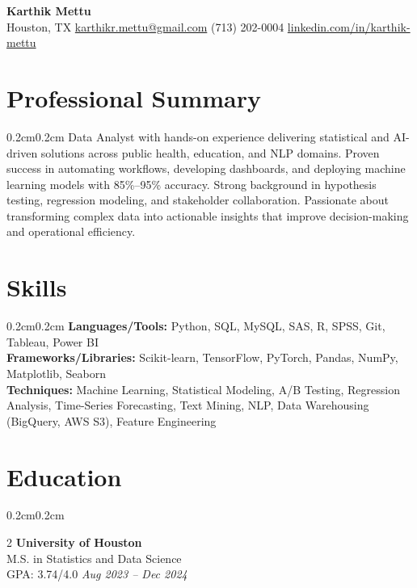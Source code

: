 \documentclass[10pt, letterpaper]{article}
\newenvironment{onecolentry}{\begin{adjustwidth}{0.2cm}{0.2cm}}{\end{adjustwidth}}
\newenvironment{twocolentry}[2][]{\onecolentry\def\secondColumn{#2}\setcolumnwidth{\fill, 4.5 cm}\begin{paracol}{2}}{\switchcolumn \raggedleft \secondColumn\end{paracol}\endonecolentry}
\begin{document}
\begin{center}
    \textbf{\fontsize{20}{24}\selectfont Karthik Mettu} \\[4pt]
    Houston, TX \quad
    \href{mailto:karthikr.mettu@gmail.com}{karthikr.mettu@gmail.com} \quad
    (713) 202-0004 \quad
    \href{https://www.linkedin.com/in/karthik-mettu/}{linkedin.com/in/karthik-mettu}
\end{center}

\section{Professional Summary}
\begin{onecolentry}
Data Analyst with hands-on experience delivering statistical and AI-driven solutions across public health, education, and NLP domains. Proven success in automating workflows, developing dashboards, and deploying machine learning models with 85\%–95\% accuracy. Strong background in hypothesis testing, regression modeling, and stakeholder collaboration. Passionate about transforming complex data into actionable insights that improve decision-making and operational efficiency.
\end{onecolentry}

\section{Skills}
\begin{onecolentry}
\textbf{Languages/Tools:} Python, SQL, MySQL, SAS, R, SPSS, Git, Tableau, Power BI \\
\textbf{Frameworks/Libraries:} Scikit-learn, TensorFlow, PyTorch, Pandas, NumPy, Matplotlib, Seaborn \\
\textbf{Techniques:} Machine Learning, Statistical Modeling, A/B Testing, Regression Analysis, Time-Series Forecasting, Text Mining, NLP, Data Warehousing (BigQuery, AWS S3), Feature Engineering
\end{onecolentry}

\section{Education}
\begin{twocolentry}{\textit{Aug 2023 – Dec 2024}}
    \textbf{University of Houston} \\
    M.S. in Statistics and Data Science \\
    GPA: 3.74/4.0
\end{twocolentry}
\end{document}

